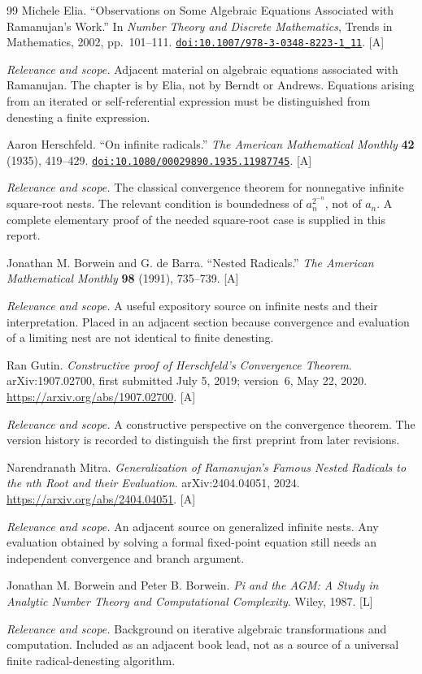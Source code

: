 \documentclass[11pt,letterpaper]{article}
\numberwithin{equation}{section}
\theoremstyle{definition}
\theoremstyle{remark}
\newcommand{\doi}[1]{\href{https://doi.org/#1}{\nolinkurl{doi:#1}}}
\newcommand{\status}[1]{\textsf{\small[#1]}}
\newcommand{\entrynote}[1]{\par\smallskip\noindent\emph{Relevance and scope.} #1}
\begin{document}
\begin{thebibliography}{99}
Michele Elia. ``Observations on Some Algebraic Equations Associated with Ramanujan's Work.'' In \emph{Number Theory and Discrete Mathematics}, Trends in Mathematics, 2002, pp.~101--111. \doi{10.1007/978-3-0348-8223-1_11}. \status{A}
\entrynote{Adjacent material on algebraic equations associated with Ramanujan. The chapter is by Elia, not by Berndt or Andrews. Equations arising from an iterated or self-referential expression must be distinguished from denesting a finite expression.}

Aaron Herschfeld. ``On infinite radicals.'' \emph{The American Mathematical Monthly} \textbf{42} (1935), 419--429. \doi{10.1080/00029890.1935.11987745}. \status{A}
\entrynote{The classical convergence theorem for nonnegative infinite square-root nests. The relevant condition is boundedness of $a_n^{2^{-n}}$, not of $a_n$. A complete elementary proof of the needed square-root case is supplied in this report.}

Jonathan M. Borwein and G. de Barra. ``Nested Radicals.'' \emph{The American Mathematical Monthly} \textbf{98} (1991), 735--739. \status{A}
\entrynote{A useful expository source on infinite nests and their interpretation. Placed in an adjacent section because convergence and evaluation of a limiting nest are not identical to finite denesting.}

Ran Gutin. \emph{Constructive proof of Herschfeld's Convergence Theorem}. arXiv:1907.02700, first submitted July 5, 2019; version~6, May 22, 2020. \url{https://arxiv.org/abs/1907.02700}. \status{A}
\entrynote{A constructive perspective on the convergence theorem. The version history is recorded to distinguish the first preprint from later revisions.}

Narendranath Mitra. \emph{Generalization of Ramanujan's Famous Nested Radicals to the nth Root and their Evaluation}. arXiv:2404.04051, 2024. \url{https://arxiv.org/abs/2404.04051}. \status{A}
\entrynote{An adjacent source on generalized infinite nests. Any evaluation obtained by solving a formal fixed-point equation still needs an independent convergence and branch argument.}

Jonathan M. Borwein and Peter B. Borwein. \emph{Pi and the AGM: A Study in Analytic Number Theory and Computational Complexity}. Wiley, 1987. \status{L}
\entrynote{Background on iterative algebraic transformations and computation. Included as an adjacent book lead, not as a source of a universal finite radical-denesting algorithm.}


\end{thebibliography}
\end{document}
